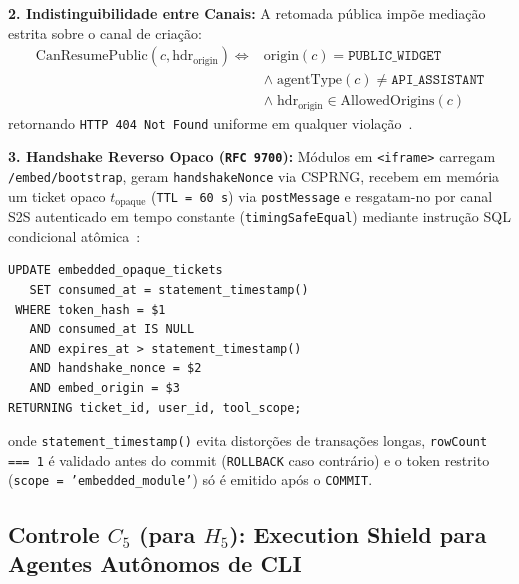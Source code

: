 \documentclass[10pt,twocolumn]{article}
\begin{document}
\textbf{2. Indistinguibilidade entre Canais:} A retomada p\'{u}blica imp\~{o}e media\c{c}\~{a}o estrita sobre o canal de cria\c{c}\~{a}o:
\begin{equation}
\begin{aligned}
\mathrm{CanResumePublic}(c, \mathrm{hdr}_{\mathrm{origin}}) \iff{} & \mathrm{origin}(c) = \texttt{PUBLIC\_WIDGET}\\
&\land\; \mathrm{agentType}(c) \neq \texttt{API\_ASSISTANT}\\
&\land\; \mathrm{hdr}_{\mathrm{origin}} \in \mathrm{AllowedOrigins}(c)
\end{aligned}
\end{equation}
retornando \texttt{HTTP 404 Not Found} uniforme em qualquer viola\c{c}\~{a}o~\cite{R01,R05}.

\textbf{3. Handshake Reverso Opaco (\texttt{RFC 9700}):} M\'{o}dulos em \texttt{<iframe>} carregam \texttt{/embed/bootstrap}, geram \texttt{handshakeNonce} via CSPRNG, recebem em mem\'{o}ria um ticket opaco $t_{\mathrm{opaque}}$ (\texttt{TTL = 60 s}) via \texttt{postMessage} e resgatam-no por canal S2S autenticado em tempo constante (\texttt{timingSafeEqual}) mediante instru\c{c}\~{a}o SQL condicional at\^{o}mica~\cite{R28}:
\begin{lstlisting}
UPDATE embedded_opaque_tickets
   SET consumed_at = statement_timestamp()
 WHERE token_hash = $1
   AND consumed_at IS NULL
   AND expires_at > statement_timestamp()
   AND handshake_nonce = $2
   AND embed_origin = $3
RETURNING ticket_id, user_id, tool_scope;
\end{lstlisting}
onde \texttt{statement\_timestamp()} evita distor\c{c}\~{o}es de transa\c{c}\~{o}es longas, \texttt{rowCount === 1} \'{e} validado antes do commit (\texttt{ROLLBACK} caso contr\'{a}rio) e o token restrito (\texttt{scope = 'embedded\_module'}) s\'{o} \'{e} emitido ap\'{o}s o \texttt{COMMIT}.

\subsection{Controle $C_5$ (para $H_5$): Execution Shield para Agentes Aut\^{o}nomos de CLI}
\end{document}
